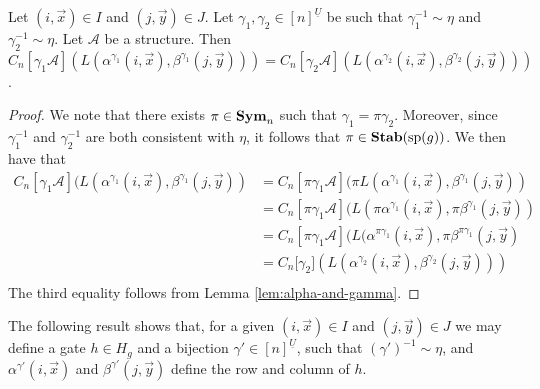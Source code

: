 \documentclass[../paper.tex]{subfiles}
\begin{document}
\begin{lem}
	\label{lem:alpha-ind-gamma}
	Let $(i,\vec{x}) \in I$ and $(j, \vec{y}) \in J$. Let $\gamma_1, \gamma_2 \in
	[n]^{\underline{U}}$ be such that $\gamma^{-1}_1 \sim \eta$ and $\gamma^{-1}_2
	\sim \eta$. Let $\mathcal{A}$ be a structure. Then $C_n[\gamma_1 \mathcal{A}]
	(L(\alpha^{\gamma_1}(i, \vec{x}), \beta^{\gamma_1}(j, \vec{y}))) =
	C_n[\gamma_2 \mathcal{A}] (L(\alpha^{\gamma_2}(i, \vec{x}),
	\beta^{\gamma_2}(j, \vec{y})))$.
\end{lem}
\begin{proof}
	We note that there exists $\pi \in \text{\textbf{Sym}}_n$ such that $\gamma_1 = \pi
	\gamma_2$. Moreover, since $\gamma^{-1}_1$ and $\gamma^{-1}_2$ are both
	consistent with $\eta$, it follows that $\pi \in \text{\textbf{Stab}} (\text{sp} (g))$. We then have
	that
	\begin{align*}
		C_n[\gamma_1 \mathcal{A}](L(\alpha^{\gamma_1}(i, \vec{x}), \beta^{\gamma_1}(j,
		\vec{y})) & = C_n[\pi \gamma_1 \mathcal{A}](\pi L(\alpha^{\gamma_1}(i, \vec{x}), 
		\beta^{\gamma_1}(j, \vec{y})) \\
		          & = C_n[\pi \gamma_1 \mathcal{A}](L(\pi                                
		\alpha^{\gamma_1}(i, \vec{x}), \pi \beta^{\gamma_1}(j, \vec{y}))\\
		          & = C_n[\pi                                                            
		\gamma_1 \mathcal{A}](L(\alpha^{\pi \gamma_1}(i, \vec{x}), \pi \beta^{\pi
		\gamma_1}(j, \vec{y})\\
		          & = C_n[\gamma_2 \mathcal] (L(\alpha^{\gamma_2}(i,                     
		\vec{x}), \beta^{\gamma_2}(j, \vec{y})))\\
	\end{align*}The third equality follows from Lemma \ref{lem:alpha-and-gamma}.
\end{proof}

The following result shows that, for a given $(i, \vec{x}) \in I$ and $(j,
\vec{y}) \in J$ we may define a gate $h \in H_g$ and a bijection $\gamma' \in
[n]^{\underline{U}}$, such that $(\gamma')^{-1} \sim \eta$, and
$\alpha^{\gamma'}(i, \vec{x})$ and $\beta^{\gamma'}(j, \vec{y})$ define the row
and column of $h$.
\end{document}
